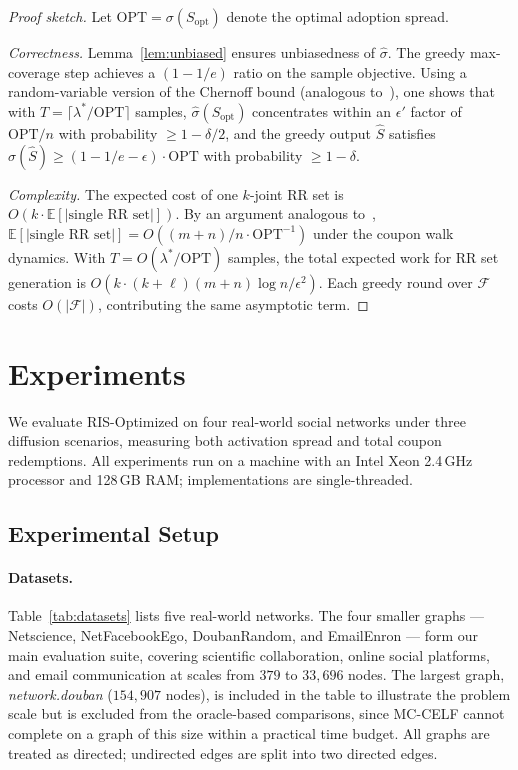 \documentclass[sigconf]{acmart}
\begin{document}
\begin{proof}[Proof sketch]
Let $\mathrm{OPT} = \sigma(S_{\mathrm{opt}})$ denote the optimal adoption spread.

\textit{Correctness.} Lemma~\ref{lem:unbiased} ensures unbiasedness of $\hat{\sigma}$. The greedy max-coverage step achieves a $(1-1/e)$ ratio on the sample objective. Using a random-variable version of the Chernoff bound (analogous to~\cite{tang2015influence}), one shows that with $T = \lceil\lambda^*/\mathrm{OPT}\rceil$ samples, $\hat{\sigma}(S_{\mathrm{opt}})$ concentrates within an $\epsilon'$ factor of $\mathrm{OPT}/n$ with probability $\geq 1-\delta/2$, and the greedy output $\hat{S}$ satisfies $\sigma(\hat{S}) \geq (1-1/e-\epsilon)\cdot \mathrm{OPT}$ with probability $\geq 1-\delta$.

\textit{Complexity.} The expected cost of one $k$-joint RR set is $O(k \cdot \mathbb{E}[|\text{single RR set}|])$. By an argument analogous to~\cite{borgs2014maximizing}, $\mathbb{E}[|\text{single RR set}|] = O((m+n)/n \cdot \mathrm{OPT}^{-1})$ under the coupon walk dynamics. With $T = O(\lambda^*/\mathrm{OPT})$ samples, the total expected work for RR set generation is $O(k \cdot (k+\ell)(m+n)\log n / \epsilon^2)$. Each greedy round over $\mathcal{F}$ costs $O(|\mathcal{F}|)$, contributing the same asymptotic term.
\end{proof}

\section{Experiments}

We evaluate RIS-Optimized on four real-world social networks under three diffusion scenarios, measuring both activation spread and total coupon redemptions. All experiments run on a machine with an Intel Xeon 2.4\,GHz processor and 128\,GB RAM; implementations are single-threaded.

\subsection{Experimental Setup}
\label{sec:exp-setup}

\paragraph{Datasets.}
Table~\ref{tab:datasets} lists five real-world networks. The four smaller graphs --- Netscience, NetFacebookEgo, DoubanRandom, and EmailEnron --- form our main evaluation suite, covering scientific collaboration, online social platforms, and email communication at scales from $379$ to $33{,}696$ nodes. The largest graph, \emph{network.douban} ($154{,}907$ nodes), is included in the table to illustrate the problem scale but is excluded from the oracle-based comparisons, since MC-CELF cannot complete on a graph of this size within a practical time budget. All graphs are treated as directed; undirected edges are split into two directed edges.
\end{document}
